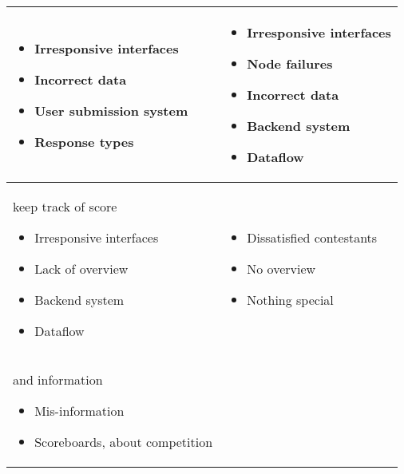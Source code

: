 \begin{tabular}{|m{2.9837599in}|m{3.1087599in}|}
\hline
\begin{itemize}
\item Irresponsive interfaces
\item
Incorrect data
\end{itemize}
\begin{itemize}
\item User submission system
\item
Response types
\end{itemize}
 &
\begin{itemize}
\item Irresponsive interfaces
\item Node failures
\item Incorrect data
\end{itemize}

\begin{itemize}
\item Backend system\item 
Dataflow
\end{itemize}
\\\hline
keep track of score
\begin{itemize}
\item Irresponsive interfaces
\item
Lack of overview
\end{itemize}
\begin{itemize}
\item Backend system
\item 
Dataflow
\end{itemize}
 &
\begin{itemize}
\item Dissatisfied contestants\item
No overview\end{itemize}
\begin{itemize}
\item Nothing special\end{itemize}
\\\hline
and information
\begin{itemize}
\item Mis-information
\end{itemize}
\begin{itemize}
\item Scoreboards, about competition
\end{itemize}
 &
\\
\hline
\end{tabular}

